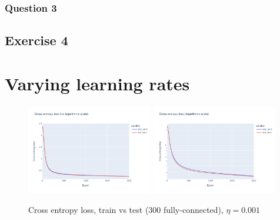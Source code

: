 \documentclass[12pt]{article}
\begin{document}
\subsubsection{Question 3}
\subsection{Exercise 4}

\newpage
\appendix
\section{Varying learning rates}
\label{appendix: varying learning rates}
\begin{figure}[ht]
  \centering
  \includegraphics[width=0.49\textwidth]{images/cross-entropy-comparison-1-300-lr0.001.png}
  \includegraphics[width=0.49\textwidth]{images/cross-entropy-comparison-1-300-lr0.001-log.png}
  \caption{Cross entropy loss, train vs test ($300$ fully-connected), $\eta = 0.001$}
  \label{fig: learning rate comparison 0.001}
\end{figure}
\end{document}
